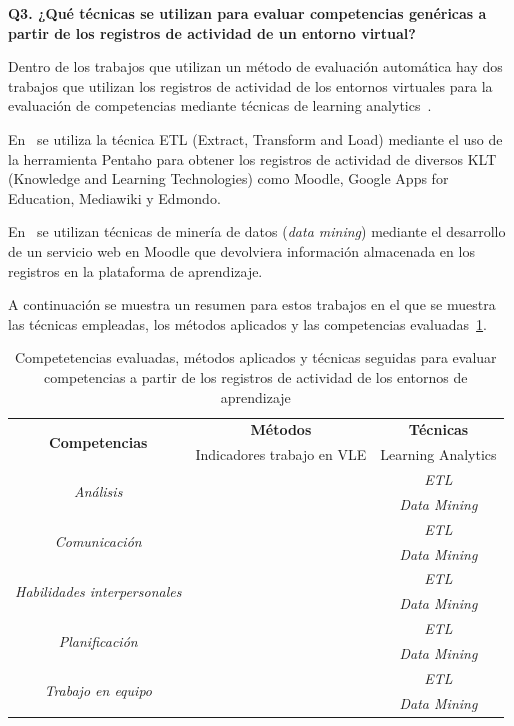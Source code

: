 \bigskip
\textbf{Q3. ¿Qué técnicas se utilizan para evaluar competencias genéricas a partir de los registros de actividad de un entorno virtual?}

Dentro de los trabajos que utilizan un método de evaluación automática hay dos trabajos que utilizan los registros de actividad de los entornos virtuales para la evaluación de competencias mediante técnicas de learning analytics~\cite{rayon2014web,fidalgo:2015}. 

En~\cite{rayon2014web} se utiliza la técnica ETL (Extract, Transform and Load) mediante el uso de la herramienta Pentaho para obtener los registros de actividad de diversos KLT (Knowledge and Learning Technologies) como Moodle, Google Apps for Education, Mediawiki y Edmondo.

En~\cite{fidalgo:2015} se utilizan técnicas de minería de datos (\emph{data mining}) mediante el desarrollo de un servicio web en Moodle que devolviera información almacenada en los registros en la plataforma de aprendizaje.

A continuación se muestra un resumen para estos trabajos en el que se muestra las técnicas empleadas, los métodos aplicados y las competencias evaluadas~\ref{tab:CompetenciasMetodosTecnicas}.

\begin{table}
  \begin{center}
  \begin{tabular}{| c | c | c |}
    \hline
     \multirow{2}{*}{\textbf{Competencias}} & \textbf{Métodos} &\textbf{Técnicas} \\
    \cline{2-3}
     &  Indicadores trabajo en VLE & Learning Analytics \\
    \hline
    \hline
    \multirow{2}{*}{\emph{Análisis}} & \cite{rayon2014web} & \emph{ETL}  \\
    \cline{2-3}
     &  & \emph{Data Mining} \\
    \hline
    \multirow{2}{*}{\emph{Comunicación}} & \cite{rayon2014web} & \emph{ETL} \\
    \cline{2-3}
     &  & \emph{Data Mining} \\
    \hline
    \multirow{2}{*}{\emph{Habilidades interpersonales}} & \cite{rayon2014web} & \emph{ETL} \\
    \cline{2-3}
     &  & \emph{Data Mining} \\
    \hline
    \multirow{2}{*}{\emph{Planificación}} & \cite{rayon2014web} & \emph{ETL} \\
    \cline{2-3}
     &  & \emph{Data Mining} \\
    \hline
    \multirow{2}{*}{\emph{Trabajo en equipo}} & \cite{rayon2014web} & \emph{ETL} \\
    \cline{2-3}
     & \cite{fidalgo:2015} & \emph{Data Mining} \\
    \hline
  \end{tabular}
\end{center}
\caption{Competetencias evaluadas, métodos aplicados y técnicas seguidas para evaluar competencias a partir de los registros de actividad de los entornos de aprendizaje}
\label{tab:CompetenciasMetodosTecnicas}
\end{table}




